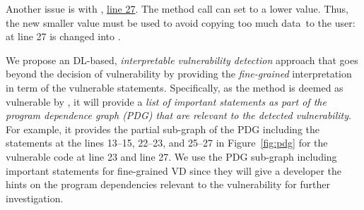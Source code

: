 Another issue is with
, \underline{line 27}. The method call 
 can set  to a lower
value. Thus, the new smaller value must be used to avoid copying too
much data~to the user:  at line 27 is changed
into .



We propose an DL-based, {\em interpretable vulnerability detection}
approach that goes beyond the decision of vulnerability by providing
the {\em fine-grained} interpretation in term of the vulnerable
statements. Specifically, as the method is deemed as vulnerable by
{\tool}, it will provide a {\em list of important statements as part
  of the program dependence graph (PDG) that are relevant to the
  detected vulnerability}. For example, it provides the partial
sub-graph of the PDG including the statements at the lines 13--15,
22--23, and 25--27 in Figure~\ref{fig:pdg} for the vulnerable code at
line 23 and line 27. We use the PDG sub-graph including important
statements for fine-grained VD since they will give a developer the
hints on the program dependencies relevant to the vulnerability for
further investigation.


